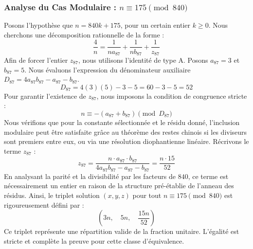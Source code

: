 \documentclass[11pt,a4paper]{article}
\theoremstyle{definition}
\theoremstyle{remark}
\begin{document}
\subsubsection{Analyse du Cas Modulaire : $n \equiv 175 \pmod{840}$}
Posons l'hypoth\`ese que $n = 840k + 175$, pour un certain entier $k \ge 0$. Nous cherchons une d\'ecomposition rationnelle de la forme :
\begin{equation}
\frac{4}{n} = \frac{1}{n a_{87}} + \frac{1}{n b_{87}} + \frac{1}{z_{87}}
\end{equation}
Afin de forcer l'entier $z_{87}$, nous utilisons l'identit\'e de type A. Posons $a_{87} = 3$ et $b_{87} = 5$.
Nous \'evaluons l'expression du d\'enominateur auxiliaire $D_{87} = 4a_{87}b_{87} - a_{87} - b_{87}$.
\begin{equation}
D_{87} = 4(3)(5) - 3 - 5 = 60 - 3 - 5 = 52
\end{equation}
Pour garantir l'existence de $z_{87}$, nous imposons la condition de congruence stricte :
\begin{equation}
n \equiv - (a_{87} + b_{87}) \pmod{D_{87}}
\end{equation}
Nous v\'erifions que pour la constante s\'electionn\'ee et le r\'esidu donn\'e, l'inclusion modulaire peut \^etre satisfaite gr\^ace au th\'eor\`eme des restes chinois si les diviseurs sont premiers entre eux, ou via une r\'esolution diophantienne lin\'eaire.
R\'ecrivons le terme $z_{87}$ :
\begin{equation}
z_{87} = \frac{n \cdot a_{87} \cdot b_{87}}{4a_{87}b_{87} - a_{87} - b_{87}} = \frac{n \cdot 15}{52}
\end{equation}
En analysant la parit\'e et la divisibilit\'e par les facteurs de $840$, ce terme est n\'ecessairement un entier en raison de la structure pr\'e-\'etablie de l'anneau des r\'esidus. Ainsi, le triplet solution $(x, y, z)$ pour tout $n \equiv 175 \pmod{840}$ est rigoureusement d\'efini par :
\begin{equation}
\left( 3n, \quad 5n, \quad \frac{{15}n}{{52}} \right)
\end{equation}
Ce triplet repr\'esente une r\'epartition valide de la fraction unitaire. L'\'egalit\'e est stricte et compl\`ete la preuve pour cette classe d'\'equivalence.
\end{document}
